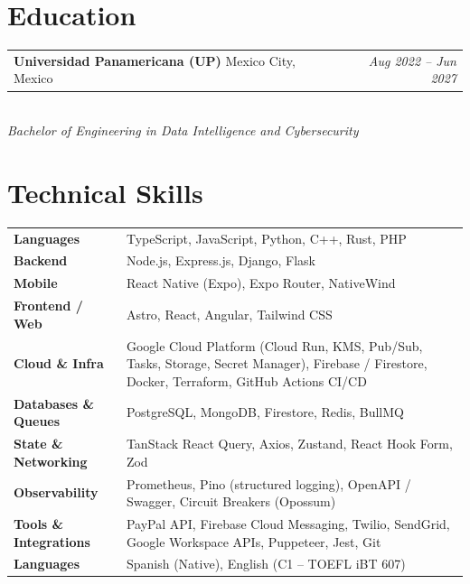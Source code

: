 \documentclass[11pt, letterpaper]{article}
\makeatletter
\newcommand{\entry}[2]{%
  \noindent
  \begin{tabular*}{\textwidth}{@{}l@{\extracolsep{\fill}}r@{}}
    #1 & #2
  \end{tabular*}%
}
\makeatother
\begin{document}
\section{Education}

\entry{%
  \textbf{Universidad Panamericana (UP)} \hspace{4pt} Mexico City, Mexico
}{%
  \textit{Aug 2022 -- Jun 2027}
}\\
\textit{Bachelor of Engineering in Data Intelligence and Cybersecurity}

\section{Technical Skills}

\setlength{\tabcolsep}{0pt}
\begin{tabular}{@{}p{1.55in}p{\dimexpr\textwidth-1.55in}@{}}
  \textbf{Languages}
  & TypeScript, JavaScript, Python, C++, Rust, PHP \\[3pt]

  \textbf{Backend}
  & Node.js, Express.js, Django, Flask \\[3pt]

  \textbf{Mobile}
  & React Native (Expo), Expo Router, NativeWind \\[3pt]

  \textbf{Frontend / Web}
  & Astro, React, Angular, Tailwind CSS \\[3pt]

  \textbf{Cloud \& Infra}
  & Google Cloud Platform (Cloud Run, KMS, Pub/Sub, Tasks, Storage,
    Secret Manager), Firebase / Firestore, Docker, Terraform,
    GitHub Actions CI/CD \\[3pt]

  \textbf{Databases \& Queues}
  & PostgreSQL, MongoDB, Firestore, Redis, BullMQ \\[3pt]

  \textbf{State \& Networking}
  & TanStack React Query, Axios, Zustand,
    React Hook Form, Zod \\[3pt]

  \textbf{Observability}
  & Prometheus, Pino (structured logging), OpenAPI / Swagger,
    Circuit Breakers (Opossum) \\[3pt]

  \textbf{Tools \& Integrations}
  & PayPal API, Firebase Cloud Messaging, Twilio, SendGrid,
    Google Workspace APIs, Puppeteer, Jest, Git \\[3pt]

  \textbf{Languages}
  & Spanish (Native), English (C1 -- TOEFL iBT 607) \\
\end{tabular}
\end{document}
